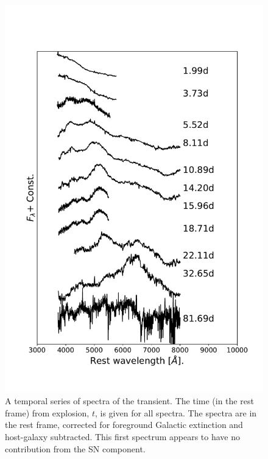 \documentclass[fleqn,usenatbib]{mnras}
\begin{document}
\begin{figure}
\centering
\includegraphics[scale=0.7]{plots/specnoAGsub.pdf}
\caption{A temporal series of spectra of  the transient. The time (in the rest frame) from explosion, $t$, is given for all 
spectra. The spectra are in the rest frame, corrected for foreground Galactic extinction and host-galaxy subtracted. This first spectrum appears to have no contribution from the SN component.}
\label{fig:spec}
\end{figure}
\end{document}
